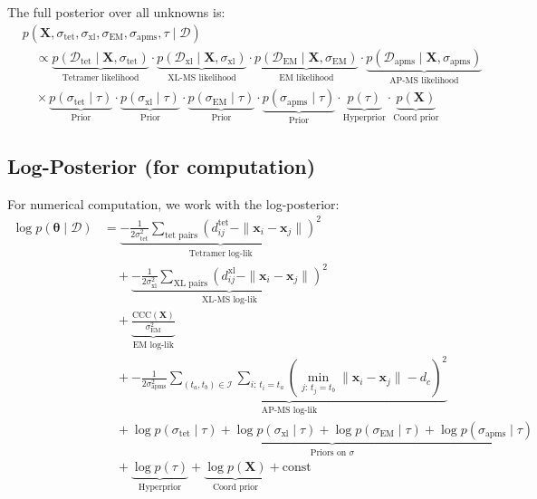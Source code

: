 \documentclass[11pt,a4paper]{article}
\newcommand{\btheta}{\boldsymbol{\theta}}
\newcommand{\bx}{\mathbf{x}}
\newcommand{\bX}{\mathbf{X}}
\theoremstyle{definition}
\begin{document}
The full posterior over all unknowns is:
\begin{equation}
\boxed{
\begin{aligned}
    &p(\bX, \sigma_{\text{tet}}, \sigma_{\text{xl}}, \sigma_{\text{EM}}, \sigma_{\text{apms}}, \tau \mid \mathcal{D}) \\ 
    &\quad\propto 
    \underbrace{p(\mathcal{D}_{\text{tet}} \mid \bX, \sigma_{\text{tet}})}_{\text{Tetramer likelihood}}
    \cdot \underbrace{p(\mathcal{D}_{\text{xl}} \mid \bX, \sigma_{\text{xl}})}_{\text{XL-MS likelihood}}
    \cdot \underbrace{p(\mathcal{D}_{\text{EM}} \mid \bX, \sigma_{\text{EM}})}_{\text{EM likelihood}}
    \cdot \underbrace{p(\mathcal{D}_{\text{apms}} \mid \bX, \sigma_{\text{apms}})}_{\text{AP-MS likelihood}} \\
    &\quad\times 
    \underbrace{p(\sigma_{\text{tet}} \mid \tau)}_{\text{Prior}}
    \cdot \underbrace{p(\sigma_{\text{xl}} \mid \tau)}_{\text{Prior}}
    \cdot \underbrace{p(\sigma_{\text{EM}} \mid \tau)}_{\text{Prior}}
    \cdot \underbrace{p(\sigma_{\text{apms}} \mid \tau)}_{\text{Prior}}
    \cdot \underbrace{p(\tau)}_{\text{Hyperprior}}
    \cdot \underbrace{p(\bX)}_{\text{Coord prior}}
\end{aligned}
}
\end{equation}

\subsection{Log-Posterior (for computation)}

For numerical computation, we work with the log-posterior:
\begin{equation}
\begin{aligned}
    \log p(\btheta \mid \mathcal{D}) &= 
    \underbrace{-\frac{1}{2\sigma_{\text{tet}}^2} \sum_{\text{tet pairs}} (d_{ij}^{\text{tet}} - \|\bx_i - \bx_j\|)^2}_{\text{Tetramer log-lik}} \\
    &\quad + \underbrace{-\frac{1}{2\sigma_{\text{xl}}^2} \sum_{\text{XL pairs}} (d_{ij}^{\text{xl}} - \|\bx_i - \bx_j\|)^2}_{\text{XL-MS log-lik}} \\
    &\quad + \underbrace{\frac{\text{CCC}(\bX)}{\sigma_{\text{EM}}^2}}_{\text{EM log-lik}} \\
    &\quad + \underbrace{-\frac{1}{2\sigma_{\text{apms}}^2} \sum_{(t_a, t_b) \in \mathcal{I}} \sum_{i:\, t_i = t_a} \!\left(\min_{j:\, t_j = t_b} \|\bx_i - \bx_j\| - d_c\right)^{\!2}}_{\text{AP-MS log-lik}} \\
    &\quad + \underbrace{\log p(\sigma_{\text{tet}} \mid \tau) + \log p(\sigma_{\text{xl}} \mid \tau) + \log p(\sigma_{\text{EM}} \mid \tau) + \log p(\sigma_{\text{apms}} \mid \tau)}_{\text{Priors on } \sigma} \\
    &\quad + \underbrace{\log p(\tau)}_{\text{Hyperprior}} + \underbrace{\log p(\bX)}_{\text{Coord prior}} + \text{const}
\end{aligned}
\end{equation}
\end{document}
